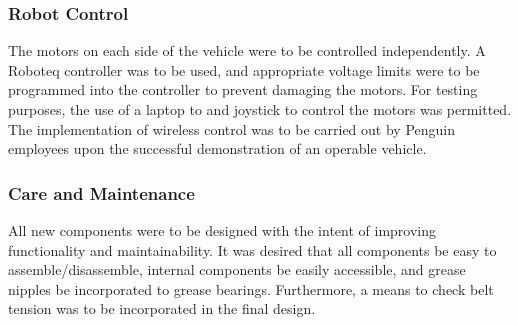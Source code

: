 \subsubsection{Robot Control}
The motors on each side of the vehicle were to be controlled independently. A Roboteq controller was to be used, and appropriate voltage limits were to be programmed into the controller to prevent damaging the motors. For testing purposes, the use of a laptop to and joystick to control the motors was permitted. The implementation of wireless control was to be carried out by Penguin employees upon the successful demonstration of an operable vehicle.
\subsubsection{Care and Maintenance}
All new components were to be designed with the intent of improving functionality and maintainability. It was desired that all components be easy to assemble/disassemble, internal components be easily accessible, and grease nipples be incorporated to grease bearings. Furthermore, a means to check belt tension was to be incorporated in the final design.       